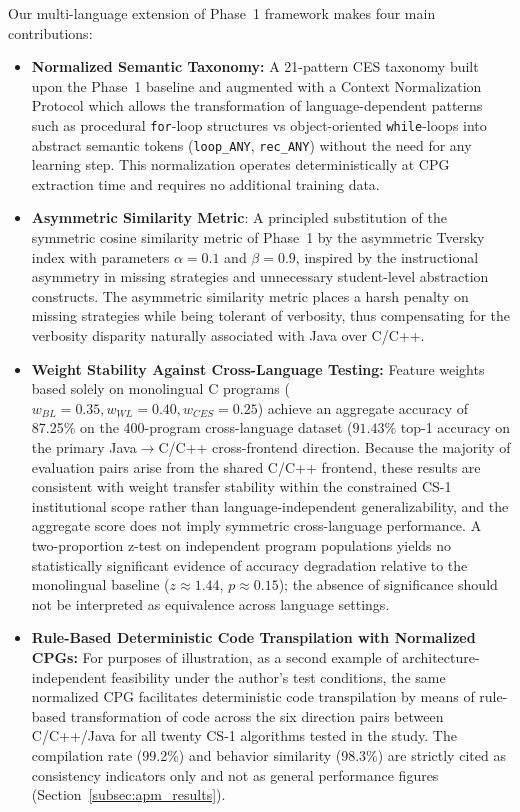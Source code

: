 Our multi-language extension of Phase~1 framework makes four main contributions:
\begin{itemize}
    \item \textbf{Normalized Semantic Taxonomy:} A 21-pattern CES taxonomy built upon the Phase~1 baseline and augmented with a Context Normalization Protocol which allows the transformation of language-dependent patterns such as procedural \texttt{for}-loop structures vs object-oriented \texttt{while}-loops into abstract semantic tokens (\texttt{loop\_ANY}, \texttt{rec\_ANY}) without the need for any learning step. This normalization operates deterministically at CPG extraction time and requires no additional training data.
    \item \textbf{Asymmetric Similarity Metric}: A principled substitution of the symmetric cosine similarity metric of Phase~1 by the asymmetric Tversky index with parameters $\alpha{=}0.1$ and $\beta{=}0.9$, inspired by the instructional asymmetry in missing strategies and unnecessary student-level abstraction constructs. The asymmetric similarity metric places a harsh penalty on missing strategies while being tolerant of verbosity, thus compensating for the verbosity disparity naturally associated with Java over C/C++.
    \item \textbf{Weight Stability Against Cross-Language Testing:} Feature weights based solely on monolingual C programs ($w_{BL}=0.35, w_{WL}=0.40, w_{CES}=0.25$) achieve an aggregate accuracy of 87.25\% on the 400-program cross-language dataset ($91.43\%$ top-1 accuracy on the primary Java$\rightarrow$C/C++ cross-frontend direction. Because the majority of evaluation pairs arise from the shared C/C++ frontend, these results are consistent with weight transfer stability within the constrained CS-1 institutional scope rather than language-independent generalizability, and the aggregate score does not imply symmetric cross-language performance. A two-proportion z-test on independent program populations yields no statistically significant evidence of accuracy degradation relative to the monolingual baseline ($z \approx 1.44$, $p \approx 0.15$); the absence of significance should not be interpreted as equivalence across language settings.
    \item \textbf{Rule-Based Deterministic Code Transpilation with Normalized CPGs:} For purposes of illustration, as a second example of architecture-independent feasibility under the author’s test conditions, the same normalized CPG facilitates deterministic code transpilation by means of rule-based transformation of code across the six direction pairs between C/C++/Java for all twenty CS-1 algorithms tested in the study. The compilation rate (99.2\%) and behavior similarity (98.3\%) are strictly cited as consistency indicators only and not as general performance figures (Section~\ref{subsec:apm_results}).
\end{itemize}

